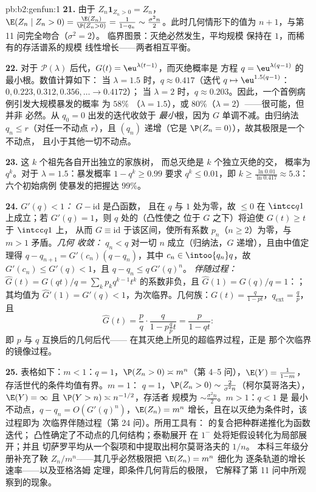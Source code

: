 \begin{solution}{pb:b2:genfun:1}
\textbf{21.} 由于 $Z_n\mathbf 1_{Z_n > 0} = Z_n$，$\E(Z_n
\mid Z_n > 0) = \frac{\E(Z_n)}{\P(Z_n > 0)} = \frac1{1 -
q_n} \sim \frac{\sigma^2n}2$。此时几何情形下的值为
$n + 1$，与第 11 问完全吻合（$\sigma^2 = 2$）。
临界图景：灭绝必然发生，平均规模
保持在 $1$，而稀有的存活谱系的规模
线性增长——两者相互平衡。

\textbf{22.} 对于 $\mathcal P(\lambda)$ 后代，$G(t) =
\eu^{\lambda(t-1)}$，而灭绝概率是
方程 $q = \eu^{\lambda(q-1)}$ 的最小根。数值计算如下：
当 $\lambda = 1.5$ 时，$q \approx 0.417$（迭代 $q \mapsto
\eu^{1.5(q-1)}$：$0, 0.223, 0.312, 0.356, \dots \to 0.4172$）；
当 $\lambda = 2$ 时，$q \approx 0.203$。因此，一个首例病例引发大规模暴发的概率
为 $58\%$
（$\lambda = 1.5$），或 $80\%$（$\lambda = 2$）——很可能，但并非
必然。从 $q_0 = 0$ 出发的迭代收敛于
\emph{最小}根，因为 $G$ 单调不减。由归纳法
$q_n \leq r$（对任一不动点 $r$），且 $(q_n)$
递增（它是 $\P(Z_n = 0)$），故其极限是一个不动点，
且小于其他一切不动点。

\textbf{23.} 这 $k$ 个祖先各自开出独立的家族树，
而总灭绝是 $k$ 个独立灭绝的交，
概率为 $q^k$。对于
$\lambda = 1.5$：暴发概率 $1 - q^k \geq 0.99$
要求 $q^k \leq 0.01$，即 $k \geq
\frac{\ln 0.01}{\ln 0.417} \approx 5.3$：六个初始病例
使暴发的把握达 $99\%$。

\textbf{24.} \emph{$G'(q) < 1$：} $G - \mathrm{id}$ 是凸函数，
且在 $q$ 与 $1$ 处为零，故 $\leq 0$ 在 $\intcc
q1$ 上成立；若 $G'(q) = 1$，则 $q$ 处的（凸性使之
位于 $G$ 之下）将迫使 $G(t) \geq t$ 于 $\intcc q1$ 上，
从而 $G \equiv \mathrm{id}$ 于该区间，使所有系数
$p_n$（$n \geq 2$）为零，与 $m > 1$ 矛盾。\emph{几何
收敛：} $q_n < q$ 对一切 $n$ 成立（归纳法，$G$
递增），且由中值定理得 $q - q_{n+1} =
G'(c_n)(q - q_n)$，其中 $c_n \in \intoo{q_n}q$，故 $G'(c_n)
\leq G'(q) < 1$，且 $q - q_n \leq q\,G'(q)^n$。
\emph{伴随过程：} $\widehat G(t) = G(qt)/q =
\sum_kp_kq^{k-1}t^k$ 的系数非负，且
$\widehat G(1) = G(q)/q = 1$：；其均值为 $\widehat
G'(1) = G'(q) < 1$，为次临界。几何族：$G(t) =
\frac{q}{1-pt}$，$q_{\mathrm{ext}} = \frac qp$，且
\[
\widehat G(t) = \frac pq\cdot\frac{q}{1 - p\frac qp t}
= \frac{p}{1 - qt} :
\]
即 $p$ 与 $q$ 互换后的几何后代——
在其灭绝上所见的超临界过程，正是
那个次临界的镜像过程。

\textbf{25.} 表格如下：$m < 1$：$q = 1$，$\P(Z_n > 0)
\asymp m^n$（第 4--5 问），$\E(Y) = \frac1{1-m}$，
存活世代的条件均值有界。$m = 1$：
$q = 1$，$\P(Z_n > 0) \sim \frac2{\sigma^2n}$（柯尔莫哥洛夫），
$\E(Y) = \infty$ 且 $\P(Y > n) \asymp n^{-1/2}$，存活者
规模为 $\sim \frac{\sigma^2n}2$。$m > 1$：$q < 1$ 是
最小不动点，$q - q_n = O(G'(q)^n)$，$\E(Z_n) = m^n$
增长，且在以灭绝为条件时，该过程即为
次临界伴随过程（第 24 问）。所用工具有：
的复合把种群递推化为函数迭代；
凸性确定了不动点的几何结构；泰勒展开
在 $1^-$ 处将矩假设转化为局部展开；并且
切萨罗平均从一个裂项和中提取出柯尔莫哥洛夫的 $1/n$。
本科三年级分册补充了鞅 $Z_n/
m^n$——其几乎必然极限把 $\E(Z_n) = m^n$ 细化为
逐条轨道的增长速率——以及亚格洛姆
定理，即条件几何背后的极限，
它解释了第 11 问中所观察到的现象。
\end{solution}
